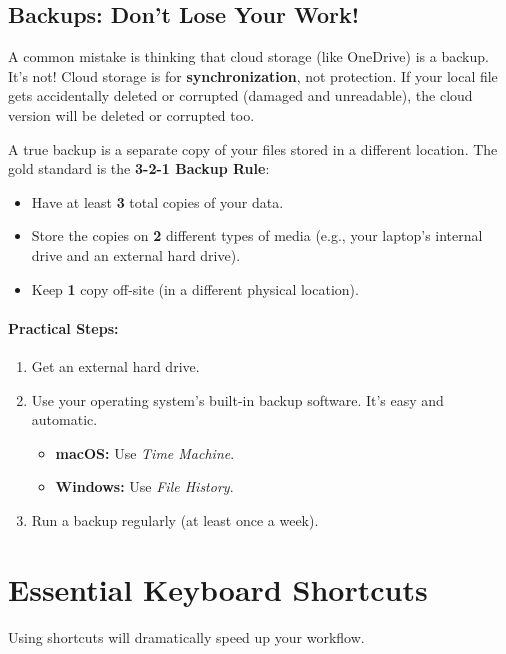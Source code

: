 \documentclass[11pt,a4paper]{report}
\begin{document}
\subsection{Backups: Don't Lose Your Work!}

A common mistake is thinking that cloud storage (like OneDrive) is a backup. It's not! Cloud storage is for \textbf{synchronization}, not protection. If your local file gets accidentally deleted or corrupted (damaged and unreadable), the cloud version will be deleted or corrupted too.


A true backup is a separate copy of your files stored in a different location. The gold standard is the \textbf{3-2-1 Backup Rule}:
\begin{itemize}
    \item Have at least \textbf{3} total copies of your data.
    \item Store the copies on \textbf{2} different types of media (e.g., your laptop's internal drive and an external hard drive).
    \item Keep \textbf{1} copy off-site (in a different physical location).
        
\end{itemize}

\paragraph{Practical Steps:}
\begin{enumerate}
    \item Get an external hard drive. 
    \item Use your operating system's built-in backup software. It's easy and automatic.
    \begin{itemize}
        \item \textbf{macOS:} Use \emph{Time Machine}.
        \item \textbf{Windows:} Use \emph{File History}.
    \end{itemize}
    \item Run a backup regularly (at least once a week).
\end{enumerate}


\section{Essential Keyboard Shortcuts}
Using shortcuts will dramatically speed up your workflow.
\end{document}

